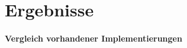 \section{Ergebnisse}
\label{ergebnisse}

\paragraph{Vergleich \bzgl{} vorhandener Implementierungen}
\label{vergleich_ergebnisse}
